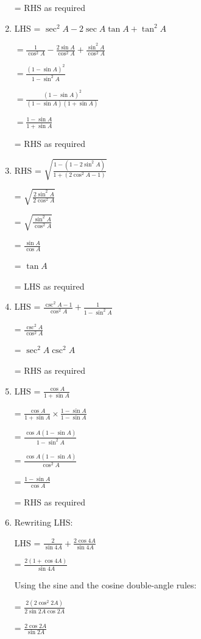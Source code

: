 \documentclass[../main.tex]{subfiles}
\begin{document}
\begin{enumerate}
    = RHS as required
    
    \item 
    
    LHS = $\sec^2{A}-2\sec{A}\tan{A}+\tan^2{A}$

    $= \frac{1}{\cos^2{A}}-\frac{2\sin{A}}{\cos^2{A}}+\frac{\sin^2{A}}{\cos^2{A}}$

    $= \frac{(1-\sin{A})^2}{1-\sin^2{A}}$

    $= \frac{(1-\sin{A})^2}{(1-\sin{A})(1+\sin{A})}$

    $= \frac{1-\sin{A}}{1+\sin{A}}$
    
    = RHS as required

    \item RHS = $\sqrt{\frac{1-(1-2\sin^2{A})}{1+(2\cos^2{A}-1)}}$

    = $\sqrt{\frac{2\sin^2{A}}{2\cos^2{A}}}$

    = $\sqrt{\frac{\sin^2{A}}{\cos^2{A}}}$

    = $\frac{\sin{A}}{\cos{A}}$

    = $\tan{A}$

    = LHS as required

    \item LHS = $\frac{\csc^2{A}-1}{\cos^2{A}}+\frac{1}{1-\sin^2{A}}$

    = $\frac{\csc^2{A}}{\cos^2{A}}$

    = $\sec^2{A}\csc^2{A}$

    = RHS as required

    \item LHS = $\frac{\cos{A}}{1+\sin{A}}$

    = $\frac{\cos{A}}{1+\sin{A}} \times \frac{1-\sin{A}}{1-\sin{A}}$

    = $\frac{\cos{A}(1-\sin{A})}{1-\sin^2{A}}$

    = $\frac{\cos{A}(1-\sin{A})}{\cos^2{A}}$

    = $\frac{1-\sin{A}}{\cos{A}}$

    = RHS as required

    \item Rewriting LHS:

    LHS = $\frac{2}{\sin{4A}}+\frac{2\cos{4A}}{\sin{4A}}$

    = $\frac{2(1+\cos{4A})}{\sin{4A}}$

    Using the sine and the cosine double-angle rules:

    = $\frac{2(2\cos^2{2A})}{2\sin{2A}\cos{2A}}$

    = $\frac{2\cos{2A}}{\sin{2A}}$


\end{enumerate}
\end{document}
